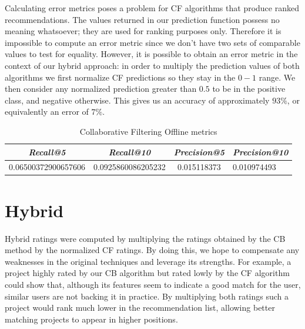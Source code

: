 \documentclass[cic,tc,english]{iiufrgs}
\begin{document}
Calculating error metrics poses a problem for CF algorithms that produce ranked recommendations. The values returned in our prediction function possess no meaning whatsoever; they are used for ranking purposes only. Therefore it is impossible to compute an error metric since we don't have two sets of comparable values to test for equality. However, it is possible to obtain an error metric in the context of our hybrid approach: in order to multiply the prediction values of both algorithms we first normalize CF predictions so they stay in the $0-1$ range. We then consider any normalized prediction greater than $0.5$ to be in the positive class, and negative otherwise. This gives us an accuracy of approximately $93\%$, or equivalently an error of $7\%$.


\begin{table}[h]
    \caption{Collaborative Filtering Offline metrics}
    \centering
        \begin{tabular}{c|c|c|p{5cm}}
          \hline
          \textit{Recall@5}  &   \textit{Recall@10}  &   \textit{Precision@5} &   \textit{Precision@10} \\
          \hline
          \hline
          0.06500372900657606           & 0.0925860086205232 &  0.015118373  & 0.010974493  \\
          \hline
        \end{tabular}
    \label{tbl:cb_offline_metrics}
\end{table}

\section{Hybrid}
Hybrid ratings were computed by multiplying the ratings obtained by the CB method by the normalized CF ratings. By doing this, we hope to compensate any weaknesses in the original techniques and leverage its strengths. For example, a project highly rated by our CB algorithm but rated lowly by the CF algorithm could show that, although its features seem to indicate a good match for the user, similar users are not backing it in practice. By multiplying both ratings such a project would rank much lower in the recommendation list, allowing better matching projects to appear in higher positions.
\end{document}
